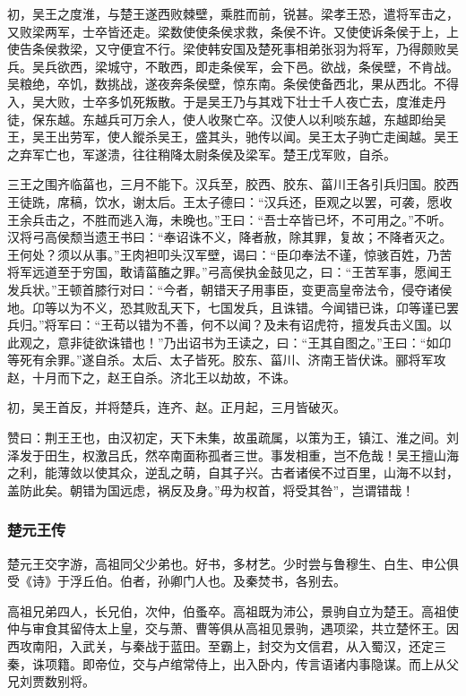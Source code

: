\documentclass[]{article}
\begin{document}
初，吴王之度淮，与楚王遂西败棘壁，乘胜而前，锐甚。梁孝王恐，遣将军击之，又败梁两军，士卒皆还走。梁数使使条侯求救，条侯不许。又使使诉条侯于上，上使告条侯救梁，又守便宜不行。梁使韩安国及楚死事相弟张羽为将军，乃得颇败吴兵。吴兵欲西，梁城守，不敢西，即走条侯军，会下邑。欲战，条侯壁，不肯战。吴粮绝，卒饥，数挑战，遂夜奔条侯壁，惊东南。条侯使备西北，果从西北。不得入，吴大败，士卒多饥死叛散。于是吴王乃与其戏下壮士千人夜亡去，度淮走丹徒，保东越。东越兵可万余人，使人收聚亡卒。汉使人以利啖东越，东越即绐吴王，吴王出劳军，使人鏦杀吴王，盛其头，驰传以闻。吴王太子驹亡走闽越。吴王之弃军亡也，军遂溃，往往稍降太尉条侯及梁军。楚王戊军败，自杀。

三王之围齐临菑也，三月不能下。汉兵至，胶西、胶东、菑川王各引兵归国。胶西王徒跣，席稿，饮水，谢太后。王太子德曰：``汉兵还，臣观之以罢，可袭，愿收王余兵击之，不胜而逃入海，未晚也。''王曰：``吾士卒皆已坏，不可用之。''不听。汉将弓高侯颓当遗王书曰：``奉诏诛不义，降者赦，除其罪，复故；不降者灭之。王何处？须以从事。''王肉袒叩头汉军壁，谒曰：``臣卬奉法不谨，惊骇百姓，乃苦将军远道至于穷国，敢请菑醢之罪。''弓高侯执金鼓见之，曰：``王苦军事，愿闻王发兵状。''王顿首膝行对曰：``今者，朝错天子用事臣，变更高皇帝法令，侵夺诸侯地。卬等以为不义，恐其败乱天下，七国发兵，且诛错。今闻错已诛，卬等谨已罢兵归。''将军曰：``王苟以错为不善，何不以闻？及未有诏虎符，擅发兵击义国。以此观之，意非徒欲诛错也！''乃出诏书为王读之，曰：``王其自图之。''王曰：``如卬等死有余罪。''遂自杀。太后、太子皆死。胶东、菑川、济南王皆伏诛。郦将军攻赵，十月而下之，赵王自杀。济北王以劫故，不诛。

初，吴王首反，并将楚兵，连齐、赵。正月起，三月皆破灭。

赞曰：荆王王也，由汉初定，天下未集，故虽疏属，以策为王，镇江、淮之间。刘泽发于田生，权激吕氏，然卒南面称孤者三世。事发相重，岂不危哉！吴王擅山海之利，能薄敛以使其众，逆乱之萌，自其子兴。古者诸侯不过百里，山海不以封，盖防此矣。朝错为国远虑，祸反及身。''毋为权首，将受其咎''，岂谓错哉！

\hypertarget{header-n3603}{%
\subsubsection{楚元王传}\label{header-n3603}}

楚元王交字游，高祖同父少弟也。好书，多材艺。少时尝与鲁穆生、白生、申公俱受《诗》于浮丘伯。伯者，孙卿门人也。及秦焚书，各别去。

高祖兄弟四人，长兄伯，次仲，伯蚤卒。高祖既为沛公，景驹自立为楚王。高祖使仲与审食其留侍太上皇，交与萧、曹等俱从高祖见景驹，遇项梁，共立楚怀王。因西攻南阳，入武关，与秦战于蓝田。至霸上，封交为文信君，从入蜀汉，还定三秦，诛项籍。即帝位，交与卢绾常侍上，出入卧内，传言语诸内事隐谋。而上从父兄刘贾数别将。
\end{document}
